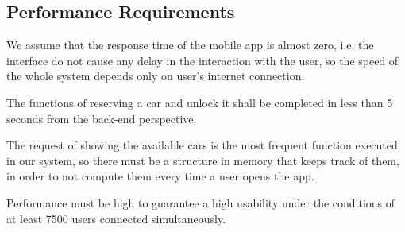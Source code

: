 \subsection{Performance Requirements}

We assume that the response time of the mobile app is almost zero, i.e. the interface do not cause any delay in the interaction with the user, so the speed of the whole system depends only on user's internet connection.

The functions of reserving a car and unlock it shall be completed in less than 5 seconds from the back-end perspective.

The request of showing the available cars is the most frequent function executed in our system, so there must be a structure in memory that keeps track of them, in order to not compute them every time a user opens the app.

Performance must be high to guarantee a high usability under the conditions of at least 7500 users connected simultaneously.
